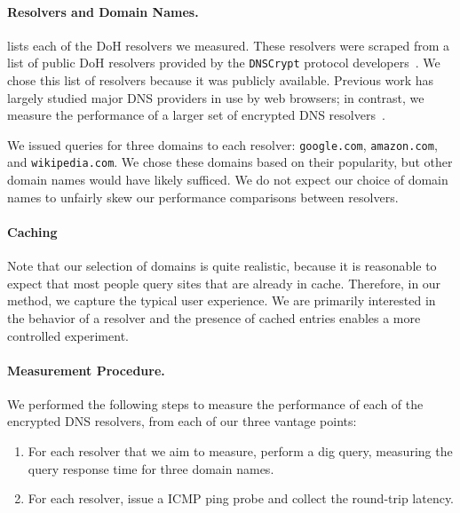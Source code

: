 \paragraph{Resolvers and Domain Names.}  lists each of 
the DoH resolvers we measured.  These resolvers were
scraped from a list of public DoH resolvers provided by the \texttt{DNSCrypt}
protocol developers~\cite{dnscrypt-public-resolvers}.
We chose this list of resolvers because it was publicly available.
Previous work has largely studied major DNS providers in use by web browsers; in contrast, we
measure the performance of a larger set of encrypted DNS resolvers~\cite{hounsel2020comparing,hounsel2021can,hoang2020k,lu2019end-to-end}.

We issued queries for three domains to each resolver: \texttt{google.com}, 
\texttt{amazon.com}, and \texttt{wikipedia.com}.  We chose these domains based on their popularity, but
other domain names would have likely sufficed.  We do not expect our choice of
domain names to unfairly skew our performance comparisons between resolvers. 

\paragraph{Caching}
Note that our selection of domains is quite realistic, because it is reasonable to expect that most people query sites that are already in cache. 
Therefore, in our method, we capture the typical user experience.
We are primarily interested in the behavior of a resolver and the presence of cached entries enables a more controlled experiment.

\paragraph{Measurement Procedure.} We performed the following steps to measure
the performance of each of the encrypted DNS resolvers, from each of our three vantage points:
\begin{enumerate} 
        \item For each resolver that we aim to measure, perform a dig query, measuring the query response time for three
            domain names.
    \item For each resolver, issue a ICMP ping
            probe and collect the round-trip latency. 
\end{enumerate}

